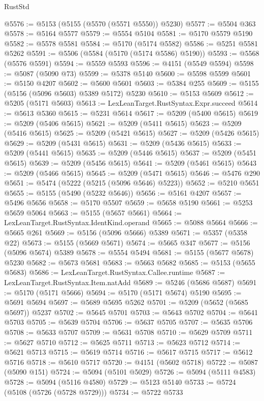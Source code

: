 \begin{lexlean}{RustStd}
\begin{coremodule}
@5576 := @5153 (@5155 (@5570 (@5571 @5550)) @5230)
@5577 := @5504 @363
@5578 := @5164 @5577
@5579 := @5554 @5104
@5581 := @5170 @5579 @5190
@5582 := @5578 @5581
@5584 := @5170 (@5174 @5582)
@5586 := @5251 @5581 @5262
@5591 := @5506 (@5584 (@5170 (@5174 @5586) @5190))
@5593 := @5568 (@5576 @5591)
@5594 := @5559 @5593
@5596 := @4151 (@5549 @5594)
@5598 := @5087 (@5090 @73)
@5599 := @5378 @5140
@5600 := @5598 @5599
@5601 := @5150 @4207
@5602 := @5600 @5601
@5603 := @5384 @255
@5609 := @5155 (@5156 (@5096 @5603) @5389 @5172) @5230
@5610 := @5153 @5609
@5612 := @5205 (@5171 @5603)
@5613 := LexLeanTarget.RustSyntax.Expr.succeed
@5614 := @5613 @5360
@5615 := @5231 @5614
@5617 := @5209 (@5400 @5615)
@5619 := @5209 (@5406 @5615)
@5621 := @5209 (@5411 @5615)
@5623 := @5209 (@5416 @5615)
@5625 := @5209 (@5421 @5615)
@5627 := @5209 (@5426 @5615)
@5629 := @5209 (@5431 @5615)
@5631 := @5209 (@5436 @5615)
@5633 := @5209 (@5441 @5615)
@5635 := @5209 (@5446 @5615)
@5637 := @5209 (@5451 @5615)
@5639 := @5209 (@5456 @5615)
@5641 := @5209 (@5461 @5615)
@5643 := @5209 (@5466 @5615)
@5645 := @5209 (@5471 @5615)
@5646 := @5476 @290
@5651 := @5474 (@5222 (@5215 (@5096 @5646) @5223))
@5652 := @5210 @5651
@5655 := @5155 (@5490 (@5232 @5646))
@5656 := @5161 @4207
@5657 := @5496 @5656
@5658 := @5170 @5507
@5659 := @5658 @5190
@5661 := @5253 @5659 @5064
@5663 := @5155 (@5657 @5661)
@5664 := LexLeanTarget.RustSyntax.IdentKind.operand
@5665 := @5088 @5664
@5666 := @5665 @261
@5669 := @5156 (@5096 @5666) @5389
@5671 := @5357 (@5358 @22)
@5673 := @5155 (@5669 @5671)
@5674 := @5665 @347
@5677 := @5156 (@5096 @5674) @5389
@5678 := @5554 @5494
@5681 := @5155 (@5677 @5678) @5230
@5682 := @5673 @5681
@5683 := @5663 @5682
@5685 := @5153 (@5655 @5683)
@5686 := LexLeanTarget.RustSyntax.Callee.runtime
@5687 := LexLeanTarget.RustSyntax.Item.natAdd
@5689 := @5246 (@5686 @5687)
@5691 := @5170 (@5171 @5666)
@5694 := @5170 (@5171 @5674) @5190
@5695 := @5691 @5694
@5697 := @5689 @5695 @5262
@5701 := @5209 (@5652 (@5685 @5697)) @5237
@5702 := @5645 @5701
@5703 := @5643 @5702
@5704 := @5641 @5703
@5705 := @5639 @5704
@5706 := @5637 @5705
@5707 := @5635 @5706
@5708 := @5633 @5707
@5709 := @5631 @5708
@5710 := @5629 @5709
@5711 := @5627 @5710
@5712 := @5625 @5711
@5713 := @5623 @5712
@5714 := @5621 @5713
@5715 := @5619 @5714
@5716 := @5617 @5715
@5717 := @5612 @5716
@5718 := @5610 @5717
@5720 := @4151 (@5602 @5718)
@5722 := @5087 (@5090 @151)
@5724 := @5094 (@5101 @5029)
@5726 := @5094 (@5111 @4583)
@5728 := @5094 (@5116 @4580)
@5729 := @5123 @5140
@5733 := @5724 (@5108 (@5726 (@5728 @5729)))
@5734 := @5722 @5733

\end{coremodule}
\end{lexlean}
